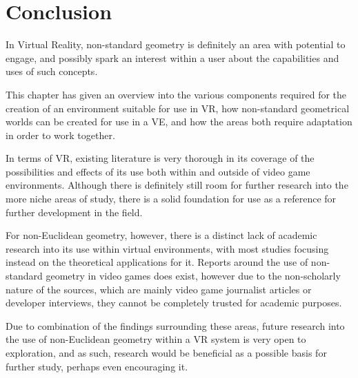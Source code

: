 \section{Conclusion}
\label{lr:conclusion}

	In Virtual Reality, non-standard geometry is definitely an area with potential to engage, and possibly spark an interest within a user about the capabilities and uses of such concepts.

	This chapter has given an overview into the various components required for the creation of an environment suitable for use in VR, how non-standard geometrical worlds can be created for use in a VE, and how the areas both require adaptation in order to work together.

	In terms of VR, existing literature is very thorough in its coverage of the possibilities and effects of its use both within and outside of video game environments.
	Although there is definitely still room for further research into the more niche areas of study, there is a solid foundation for use as a reference for further development in the field.

	For non-Euclidean geometry, however, there is a distinct lack of academic research into its use within virtual environments, with most studies focusing instead on the theoretical applications for it.
	Reports around the use of non-standard geometry in video games does exist, however due to the non-scholarly nature of the sources, which are mainly video game journalist articles or developer interviews, they cannot be completely trusted for academic purposes.

	Due to combination of the findings surrounding these areas, future research into the use of non-Euclidean geometry within a VR system is very open to exploration, and as such, research would be beneficial as a possible basis for further study, perhaps even encouraging it.
